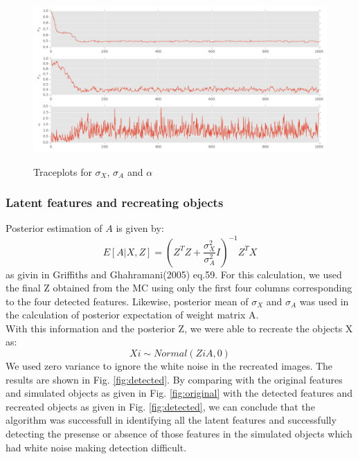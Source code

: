 \documentclass{article}
\begin{document}
\begin{figure}[ht]
\caption {Traceplots for $\sigma_X$, $\sigma_A$ and $\alpha$}
\includegraphics[width=\linewidth]{figures/Trace.png}
\label{fig:trace}
\end{figure}

\subsubsection{Latent features and recreating objects}
Posterior estimation of $A$ is given by:
\[
E[A|X,Z] = (Z^TZ+\frac{\sigma_X^2}{\sigma_A^2}I)^{-1}Z^TX
\]
as givin in Griffiths and Ghahramani(2005) eq.59. For this calculation, we used the final Z obtained from the MC using only the first four columns corresponding to the four detected features. Likewise, posterior mean of $\sigma_X$ and $\sigma_A$ was used in the calculation of posterior expectation of weight matrix A.\\
With this information and the posterior Z, we were able to recreate the objects X as:
\[
Xi \sim Normal(ZiA,0)
\]
We used zero variance to ignore the white noise in the recreated images. The results are shown in Fig. \ref{fig:detected}. By comparing with the original features and simulated objects as given in Fig. \ref{fig:original} with the detected features and recreated objects as given in Fig. \ref{fig:detected}, we can conclude that the algorithm was successfull in identifying all the latent features and successfully detecting the presense or absence of those features in the simulated objects which had white noise making detection difficult.
\end{document}
